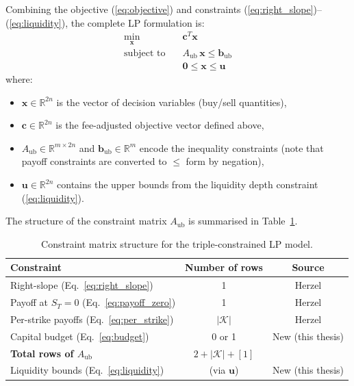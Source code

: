 \documentclass[openany]{book}
\numberwithin{figure}{chapter}
\numberwithin{equation}{chapter}
\begin{document}
Combining the objective (\ref{eq:objective}) and constraints (\ref{eq:right_slope})--(\ref{eq:liquidity}), the complete LP formulation is:
\begin{equation}
\boxed{
\begin{aligned}
\min_{\mathbf{x}} \quad & \mathbf{c}^T \mathbf{x} \\
\text{subject to} \quad & A_{\text{ub}} \, \mathbf{x} \leq \mathbf{b}_{\text{ub}} \\
& \mathbf{0} \leq \mathbf{x} \leq \mathbf{u}
\end{aligned}
}
\label{eq:complete_lp}
\end{equation}
where:
\begin{itemize}
    \item $\mathbf{x} \in \mathbb{R}^{2n}$ is the vector of decision variables (buy/sell quantities),
    \item $\mathbf{c} \in \mathbb{R}^{2n}$ is the fee-adjusted objective vector defined above,
    \item $A_{\text{ub}} \in \mathbb{R}^{m \times 2n}$ and $\mathbf{b}_{\text{ub}} \in \mathbb{R}^m$ encode the inequality constraints (note that payoff constraints are converted to $\leq$ form by negation),
    \item $\mathbf{u} \in \mathbb{R}^{2n}$ contains the upper bounds from the liquidity depth constraint (\ref{eq:liquidity}).
\end{itemize}

The structure of the constraint matrix $A_{\text{ub}}$ is summarised in Table~\ref{tab:constraints}.

\begin{table}[H]
\centering
\caption{Constraint matrix structure for the triple-constrained LP model.}
\label{tab:constraints}
\begin{tabular}{|l|c|c|}
\hline
\textbf{Constraint} & \textbf{Number of rows} & \textbf{Source} \\
\hline
Right-slope (Eq.~\ref{eq:right_slope}) & 1 & Herzel \cite{herzel2005} \\
Payoff at $S_T = 0$ (Eq.~\ref{eq:payoff_zero}) & 1 & Herzel \cite{herzel2005} \\
Per-strike payoffs (Eq.~\ref{eq:per_strike}) & $|\mathcal{K}|$ & Herzel \cite{herzel2005} \\
Capital budget (Eq.~\ref{eq:budget}) & 0 or 1 & New (this thesis) \\
\hline
\textbf{Total rows of $A_{\text{ub}}$} & $2 + |\mathcal{K}| + [1]$ & \\
\hline
Liquidity bounds (Eq.~\ref{eq:liquidity}) & (via $\mathbf{u}$) & New (this thesis) \\
\hline
\end{tabular}
\end{table}
\end{document}

